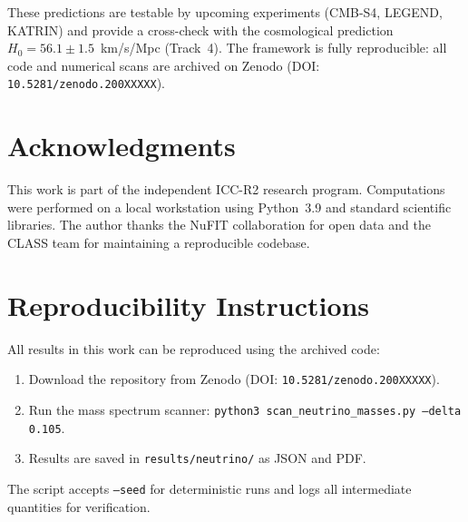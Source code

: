 \documentclass[11pt,a4paper]{article}
\newcommand{\code}[1]{\texttt{#1}}
\newcommand{\zenodoDOITrackTwo}{10.5281/zenodo.200XXXXX} %
\begin{document}
These predictions are testable by upcoming experiments (CMB-S4, LEGEND, KATRIN) and provide a cross-check with the cosmological prediction $H_0 = 56.1 \pm 1.5$~km/s/Mpc (Track~4). The framework is fully reproducible: all code and numerical scans are archived on Zenodo (DOI: \texttt{\zenodoDOITrackTwo}).

\section*{Acknowledgments}
\noindent
This work is part of the independent ICC-R2 research program. Computations were performed on a local workstation using Python~3.9 and standard scientific libraries. The author thanks the NuFIT collaboration for open data and the CLASS team for maintaining a reproducible codebase.




\appendix
\section{Reproducibility Instructions}
\label{app:repro}

All results in this work can be reproduced using the archived code:
\begin{enumerate}
    \item Download the repository from Zenodo (DOI: \texttt{\zenodoDOITrackTwo}).
    \item Run the mass spectrum scanner: \code{python3 scan\_neutrino\_masses.py --delta 0.105}.
    \item Results are saved in \code{results/neutrino/} as JSON and PDF.
\end{enumerate}

The script accepts \code{--seed} for deterministic runs and logs all intermediate quantities for verification.
\end{document}
